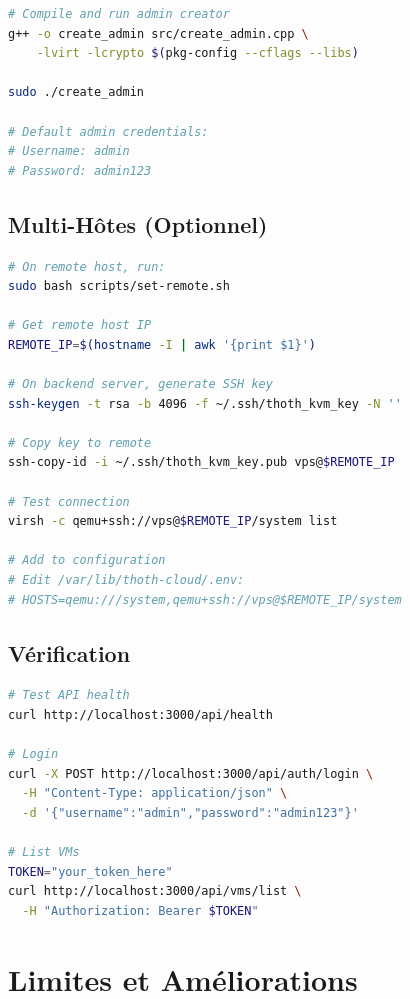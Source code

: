 \documentclass[12pt,a4paper]{article}
\begin{document}
\begin{lstlisting}[language=bash, caption=Création admin]
# Compile and run admin creator
g++ -o create_admin src/create_admin.cpp \
    -lvirt -lcrypto $(pkg-config --cflags --libs)

sudo ./create_admin

# Default admin credentials:
# Username: admin
# Password: admin123
\end{lstlisting}

\subsection{Multi-Hôtes (Optionnel)}

\begin{lstlisting}[language=bash, caption=Ajout hôte distant]
# On remote host, run:
sudo bash scripts/set-remote.sh

# Get remote host IP
REMOTE_IP=$(hostname -I | awk '{print $1}')

# On backend server, generate SSH key
ssh-keygen -t rsa -b 4096 -f ~/.ssh/thoth_kvm_key -N ''

# Copy key to remote
ssh-copy-id -i ~/.ssh/thoth_kvm_key.pub vps@$REMOTE_IP

# Test connection
virsh -c qemu+ssh://vps@$REMOTE_IP/system list

# Add to configuration
# Edit /var/lib/thoth-cloud/.env:
# HOSTS=qemu:///system,qemu+ssh://vps@$REMOTE_IP/system
\end{lstlisting}

\subsection{Vérification}

\begin{lstlisting}[language=bash, caption=Tests de vérification]
# Test API health
curl http://localhost:3000/api/health

# Login
curl -X POST http://localhost:3000/api/auth/login \
  -H "Content-Type: application/json" \
  -d '{"username":"admin","password":"admin123"}'

# List VMs
TOKEN="your_token_here"
curl http://localhost:3000/api/vms/list \
  -H "Authorization: Bearer $TOKEN"
\end{lstlisting}

\section{Limites et Améliorations}
\end{document}
